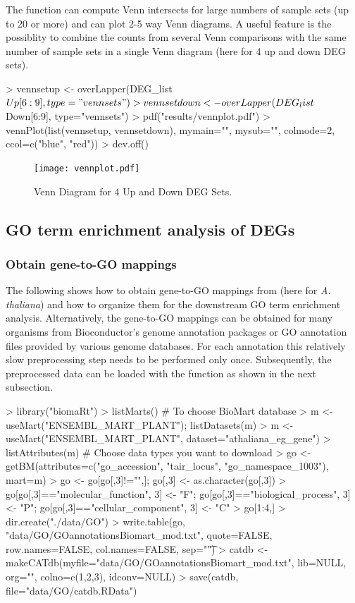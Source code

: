 \documentclass{article}
\begin{document}
The function  can compute Venn intersects for large numbers of sample sets (up to 20 or more) and  can plot 2-5 way Venn diagrams. A useful feature is the possiblity to combine the counts from several Venn comparisons with the same number of sample sets in a single Venn diagram (here for 4 up and down DEG sets).
\begin{Schunk}
\begin{Sinput}
> vennsetup <- overLapper(DEG_list$Up[6:9], type="vennsets")
> vennsetdown <- overLapper(DEG_list$Down[6:9], type="vennsets")
> pdf("results/vennplot.pdf")
> vennPlot(list(vennsetup, vennsetdown), mymain="", mysub="", colmode=2, ccol=c("blue", "red"))
> dev.off()
\end{Sinput}
\end{Schunk}
\begin{figure}[H]
  \centering
   \texttt{[image: vennplot.pdf]}
   \caption{Venn Diagram for 4 Up and Down DEG Sets.}
   \label{fig:vennplot}
\end{figure}

\subsection{GO term enrichment analysis of DEGs}
\subsubsection{Obtain gene-to-GO mappings}
The following shows how to obtain gene-to-GO mappings from  (here for \textit{A. thaliana}) and how to organize them for the downstream GO term enrichment analysis. Alternatively, the gene-to-GO mappings can be obtained for many organisms from Bioconductor's   genome annotation packages or GO annotation files provided by various genome databases. For each annotation this relatively slow preprocessing step needs to be performed only once. Subsequently, the preprocessed data can be loaded with the  function as shown in the next subsection. 
\begin{Schunk}
\begin{Sinput}
> library("biomaRt")
> listMarts() # To choose BioMart database
> m <- useMart("ENSEMBL_MART_PLANT"); listDatasets(m) 
> m <- useMart("ENSEMBL_MART_PLANT", dataset="athaliana_eg_gene")
> listAttributes(m) # Choose data types you want to download
> go <- getBM(attributes=c("go_accession", "tair_locus", "go_namespace_1003"), mart=m)
> go <- go[go[,3]!="",]; go[,3] <- as.character(go[,3])
> go[go[,3]=="molecular_function", 3] <- "F"; go[go[,3]=="biological_process", 3] <- "P"; go[go[,3]=="cellular_component", 3] <- "C"
> go[1:4,]
> dir.create("./data/GO")
> write.table(go, "data/GO/GOannotationsBiomart_mod.txt", quote=FALSE, row.names=FALSE, col.names=FALSE, sep="\t")
> catdb <- makeCATdb(myfile="data/GO/GOannotationsBiomart_mod.txt", lib=NULL, org="", colno=c(1,2,3), idconv=NULL)
> save(catdb, file="data/GO/catdb.RData") 
\end{Sinput}
\end{Schunk}
\end{document}
